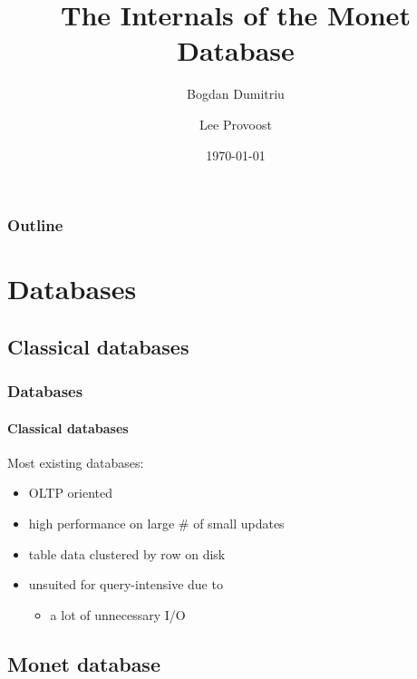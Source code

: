 \documentclass{beamer}
\title{The Internals of the Monet Database}
\author{
  Bogdan Dumitriu \and
  Lee Provoost
}
\institute
{
  Department of Computer Science\\
  University of Utrecht
}
\date{\today}
\begin{document}
\begin{frame}
  \titlepage
\end{frame}

\begin{frame}
  \frametitle{Outline}
  \tableofcontents
\end{frame}

\section{Databases}

\subsection{Classical databases}

\begin{frame}
  \frametitle{Databases}
  \framesubtitle{Classical databases}

Most existing databases:
  \begin{itemize}
  \item OLTP oriented
  \pause
  \item high performance on large \# of small updates
  \pause
  \item table data clustered by row on disk
  \pause
  \item \alert{unsuited for query-intensive due to}
  \begin{itemize}
  \item \alert{a lot of unnecessary I/O}
  \end{itemize}
  \end{itemize}

\end{frame}

\subsection{Monet database}
\end{document}
